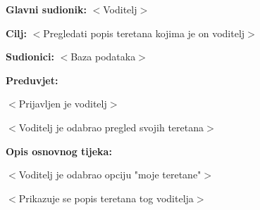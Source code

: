 					\noindent {}
					\begin{packed_item}
	
						\item \textbf{Glavni sudionik: } $<$Voditelj$>$
						\item  \textbf{Cilj:} $<$Pregledati popis teretana kojima je on voditelj$>$
						\item  \textbf{Sudionici:} $<$Baza podataka$>$
						\item  \textbf{Preduvjet:}
						\item[] \begin{packed_enum}
	
							\item $<$Prijavljen je voditelj$>$
							\item $<$Voditelj je odabrao pregled svojih teretana$>$

						\end{packed_enum}
						\item  \textbf{Opis osnovnog tijeka:}
						
						\item[] \begin{packed_enum}
	
							\item $<$Voditelj  je odabrao opciju "moje teretane"$>$
							\item $<$Prikazuje se popis teretana tog voditelja$>$
						\end{packed_enum}
						

					\end{packed_item}
					
